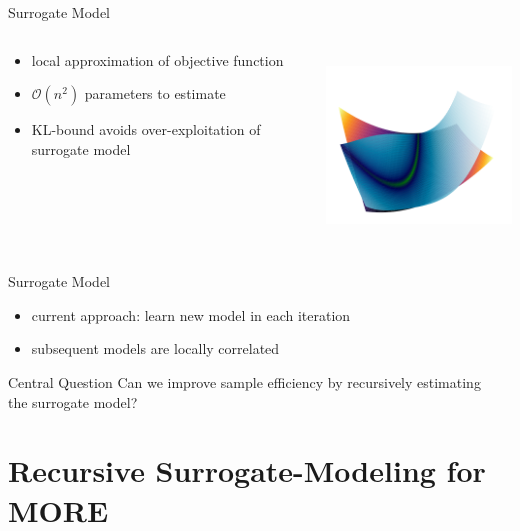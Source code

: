 \documentclass[navbarinfooter, 12pt]{sdqbeamer}
\begin{document}
\begin{frame}{Surrogate Model}
\begin{columns}[c]
  \begin{column}{8cm}
    \begin{itemize}
    \item local approximation of objective function
    \item $\mathcal{O}(n^2)$ parameters to estimate
    \item KL-bound avoids over-exploitation of surrogate model 
    \end{itemize}
  \end{column}
  \begin{column}{5cm}
    \includegraphics[height=5cm]{figures/Surrogate_Model.png}
  \end{column}
\end{columns}  
\end{frame}


\begin{frame}{Surrogate Model}
  \begin{itemize}
  \item current approach: learn new model in each iteration
  \item subsequent models are locally correlated
  \end{itemize}
  \begin{alertblock}{Central Question}
    Can we improve sample efficiency by recursively estimating \\
    the surrogate model?
  \end{alertblock}  
\end{frame}




\section{Recursive Surrogate-Modeling for MORE}
\end{document}
